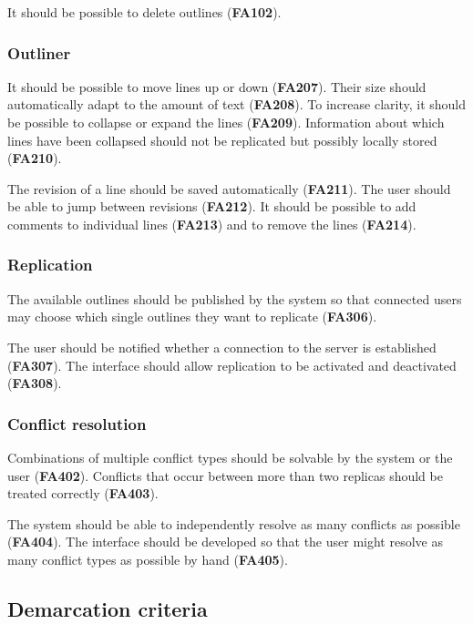 It should be possible to delete outlines (\textbf{FA102}).

\subsubsection{Outliner}

It should be possible to move lines up or down (\textbf{FA207}). Their size should automatically adapt to the amount of text (\textbf{FA208}). To increase clarity, it should be possible to collapse or expand the lines (\textbf{FA209}). Information about which lines have been collapsed should not be replicated but possibly locally stored (\textbf{FA210}).

The revision of a line should be saved automatically (\textbf{FA211}). The user should be able to jump between revisions (\textbf{FA212}). It should be possible to add comments to individual lines (\textbf{FA213}) and to remove the lines (\textbf{FA214}).

\subsubsection{Replication}

The available outlines should be published by the system so that connected users may choose which single outlines they want to replicate (\textbf{FA306}).

The user should be notified whether a connection to the server is established (\textbf{FA307}). The interface should allow replication to be activated and deactivated (\textbf{FA308}).

\subsubsection{Conflict resolution}

Combinations of multiple conflict types should be solvable by the system or the user (\textbf{FA402}). Conflicts that occur between more than two replicas should be treated correctly (\textbf{FA403}).

The system should be able to independently resolve as many conflicts as possible (\textbf{FA404}). The interface should be developed so that the user might resolve as many conflict types as possible by hand (\textbf{FA405}).


\subsection{Demarcation criteria}

